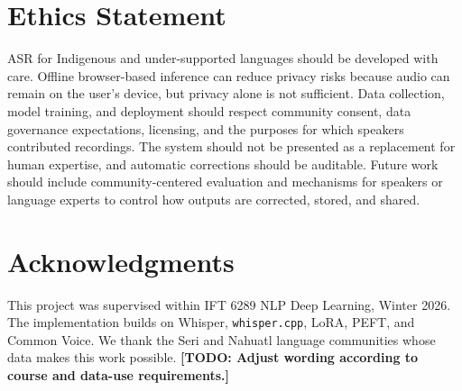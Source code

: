 \documentclass[11pt]{article}
\newif\ifofficialacl
\newcommand{\todo}[1]{\textbf{[TODO: #1]}}
\begin{document}
\section{Ethics Statement}

ASR for Indigenous and under-supported languages should be developed with care. Offline browser-based inference can reduce privacy risks because audio can remain on the user's device, but privacy alone is not sufficient. Data collection, model training, and deployment should respect community consent, data governance expectations, licensing, and the purposes for which speakers contributed recordings. The system should not be presented as a replacement for human expertise, and automatic corrections should be auditable. Future work should include community-centered evaluation and mechanisms for speakers or language experts to control how outputs are corrected, stored, and shared.

\section*{Acknowledgments}

This project was supervised within IFT 6289 NLP Deep Learning, Winter 2026. The implementation builds on Whisper, \texttt{whisper.cpp}, LoRA, PEFT, and Common Voice. We thank the Seri and Nahuatl language communities whose data makes this work possible. \todo{Adjust wording according to course and data-use requirements.}

\ifofficialacl
\else
  
\fi

\end{document}
